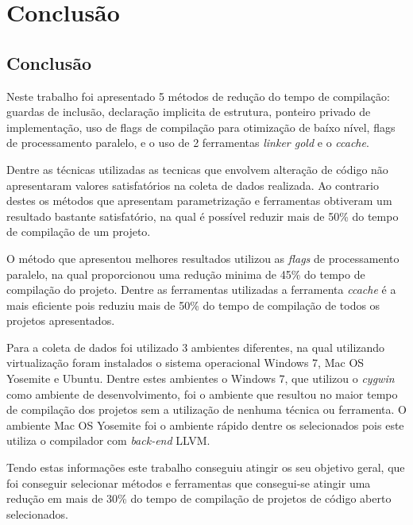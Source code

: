 \part{Conclusão}

\chapter[Conclusão]{Conclusão}

    Neste trabalho foi apresentado 5 métodos de redução do tempo de compilação: guardas de inclusão,
 declaração implicita de estrutura, ponteiro privado de implementação, uso de flags de compilação para 
 otimização de baíxo nível, flags de processamento paralelo, e o uso de 2 ferramentas \textit{linker gold} e o
 \textit{ccache}.

    Dentre as técnicas utilizadas as tecnicas que envolvem alteração de código não apresentaram
 valores satisfatórios na coleta de dados realizada. Ao contrario destes os métodos que apresentam
 parametrização e ferramentas obtiveram um resultado bastante satisfatório, na qual é possível
 reduzir mais de 50\% do tempo de compilação de um projeto.

    O método que apresentou melhores resultados utilizou as \textit{flags} de processamento paralelo, 
 na qual proporcionou uma redução minima de 45\% do tempo de compilação do projeto. Dentre as ferramentas
 utilizadas a ferramenta \textit{ccache} é a mais eficiente pois reduziu mais de 50\% do tempo de compilação
 de todos os projetos apresentados.

    Para a coleta de dados foi utilizado 3 ambientes diferentes, na qual utilizando virtualização foram instalados
 o sistema operacional Windows 7, Mac OS Yosemite e Ubuntu. Dentre estes ambientes o Windows 7, que utilizou o \textit{cygwin}
 como ambiente de desenvolvimento,  foi o ambiente que resultou no 
 maior tempo de compilação dos projetos sem a utilização de nenhuma técnica ou ferramenta. O ambiente Mac OS Yosemite
 foi o ambiente rápido dentre os selecionados pois este utiliza o compilador com \textit{back-end} LLVM.

    Tendo estas informações este trabalho conseguiu atingir os seu objetivo geral, que foi conseguir
 selecionar métodos e ferramentas que consegui-se atingir uma redução em mais de 30\% do tempo de compilação
 de projetos de código aberto selecionados.
